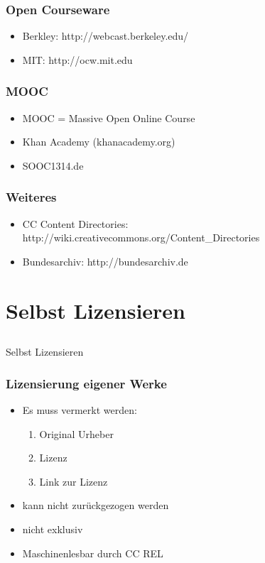 \documentclass[table]{beamer}
\begin{document}
\begin{frame}
    \frametitle{Open Courseware}
      \begin{itemize}
        \item<2-> Berkley: http://webcast.berkeley.edu/
        \item<3-> MIT: http://ocw.mit.edu
    \end{itemize}
\end{frame}

\begin{frame}
    \frametitle{MOOC}
      \begin{itemize}
        \item<2-> MOOC = Massive Open Online Course
	\item<3-> Khan Academy (khanacademy.org)
        \item<3-> SOOC1314.de
    \end{itemize}
\end{frame}

\begin{frame}
    \frametitle{Weiteres}
      \begin{itemize}
        \item<2-> CC Content Directories: http://wiki.creativecommons.org/Content\_Directories
        \item<3-> Bundesarchiv: http://bundesarchiv.de
      \end{itemize}
\end{frame}

\section{Selbst Lizensieren}
\subsection{}

\begin{frame}
    \begin{center}\Large
    Selbst Lizensieren
    \end {center}
\end{frame}

\begin{frame}
    \frametitle{Lizensierung eigener Werke}
    \begin{itemize}
        \item<2-> Es muss vermerkt werden:
            \begin{enumerate}
                \item<3-> Original Urheber
                \item<4-> Lizenz
                \item<5-> Link zur Lizenz
            \end{enumerate}
        \item<6-> kann nicht zurückgezogen werden
        \item<7-> nicht exklusiv
        \item<8-> Maschinenlesbar durch CC REL
    \end{itemize}
\end{frame}
\end{document}
